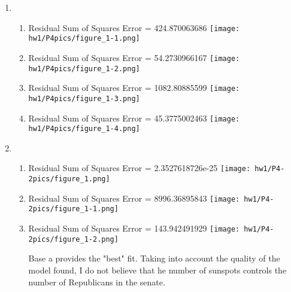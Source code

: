 \documentclass[submit]{harvardml}
\begin{document}
\begin{enumerate}
    \item
    \begin{enumerate}
        \item
        
        Residual Sum of Squares Error  =  424.870063686\newline
        \texttt{[image: hw1/P4pics/figure\_1-1.png]}
        
        \bigskip
        \item
        Residual Sum of Squares Error  =  54.2730966167\newline
        \texttt{[image: hw1/P4pics/figure\_1-2.png]}
        
        \bigskip
        \item
        Residual Sum of Squares Error  =  1082.80885599\newline
        \texttt{[image: hw1/P4pics/figure\_1-3.png]}

        \bigskip
        \item
        Residual Sum of Squares Error  =  45.3775002463\newline
        \texttt{[image: hw1/P4pics/figure\_1-4.png]}
    \end{enumerate} 
    \bigskip
    \item
     \begin{enumerate}
        \item\addtocounter{enumii}{1}
        Residual Sum of Squares Error  =  2.3527618726e-25\newline
        \texttt{[image: hw1/P4-2pics/figure\_1.png]}
        
        \bigskip
        \item
        Residual Sum of Squares Error  =  8996.36895843\newline
        \texttt{[image: hw1/P4-2pics/figure\_1-1.png]}
        
        \bigskip
        \item
        Residual Sum of Squares Error  =  143.942491929\newline
        \texttt{[image: hw1/P4-2pics/figure\_1-2.png]}

        \bigskip\bigskip Base a provides the "best" fit. Taking into account the quality of the model found, I do not believe that he number of sunspots controls the number of Republicans in the senate.
    \end{enumerate}
\end{enumerate}
\end{document}
